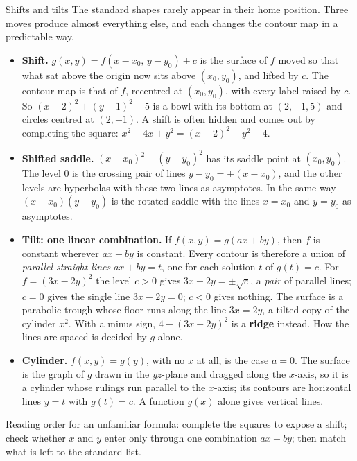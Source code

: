 \begin{rulebox}{Shifts and tilts}
The standard shapes rarely appear in their home position. Three moves
produce almost everything else, and each changes the contour map in a
predictable way.
\begin{itemize}[leftmargin=1.6em,itemsep=0.3ex]
  \item \textbf{Shift.} $g(x,y)=f(x-x_{0},\,y-y_{0})+c$ is the surface of
        $f$ moved so that what sat above the origin now sits above
        $(x_{0},y_{0})$, and lifted by $c$. The contour map is that of $f$,
        recentred at $(x_{0},y_{0})$, with every label raised by $c$. So
        $(x-2)^{2}+(y+1)^{2}+5$ is a bowl with its bottom at $(2,-1,5)$ and
        circles centred at $(2,-1)$. A shift is often hidden and comes out
        by completing the square:
        $x^{2}-4x+y^{2}=(x-2)^{2}+y^{2}-4$.
  \item \textbf{Shifted saddle.} $(x-x_{0})^{2}-(y-y_{0})^{2}$ has its
        saddle point at $(x_{0},y_{0})$. The level $0$ is the crossing pair
        of lines $y-y_{0}=\pm(x-x_{0})$, and the other levels are
        hyperbolas with these two lines as asymptotes. In the same way
        $(x-x_{0})(y-y_{0})$ is the rotated saddle with the lines $x=x_{0}$
        and $y=y_{0}$ as asymptotes.
  \item \textbf{Tilt: one linear combination.} If $f(x,y)=g(ax+by)$, then
        $f$ is constant wherever $ax+by$ is constant. Every contour is
        therefore a union of \emph{parallel straight lines}
        $ax+by=t$, one for each solution $t$ of $g(t)=c$. For
        $f=(3x-2y)^{2}$ the level $c>0$ gives $3x-2y=\pm\sqrt{c}$, a
        \emph{pair} of parallel lines; $c=0$ gives the single line
        $3x-2y=0$; $c<0$ gives nothing. The surface is a parabolic trough
        whose floor runs along the line $3x=2y$, a tilted copy of the
        cylinder $x^{2}$. With a minus sign, $4-(3x-2y)^{2}$ is a
        \textbf{ridge} instead. How the lines are spaced is decided by $g$
        alone.
  \item \textbf{Cylinder.} $f(x,y)=g(y)$, with no $x$ at all, is the case
        $a=0$. The surface is the graph of $g$ drawn in the $yz$-plane and
        dragged along the $x$-axis, so it is a cylinder whose rulings run
        parallel to the $x$-axis; its contours are horizontal lines $y=t$
        with $g(t)=c$. A function $g(x)$ alone gives vertical lines.
\end{itemize}
Reading order for an unfamiliar formula: complete the squares to expose a
shift; check whether $x$ and $y$ enter only through one combination
$ax+by$; then match what is left to the standard list.
\end{rulebox}

